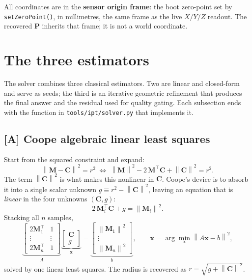 \documentclass[11pt,a4paper]{article}
\newcommand{\M}{\mathbf{M}}
\newcommand{\bP}{\mathbf{P}}
\newcommand{\bC}{\mathbf{C}}
\newcommand{\bx}{\mathbf{x}}
\newcommand{\norm}[1]{\left\lVert #1 \right\rVert}
\begin{document}
All coordinates are in the \textbf{sensor origin frame}: the boot zero-point set by
\texttt{setZeroPoint()}, in millimetres, the same frame as the live $X/Y/Z$ readout.
The recovered $\bP$ inherits that frame; it is not a world coordinate.

\section{The three estimators}
\label{sec:estimators}

The solver combines three classical estimators. Two are linear and closed-form and
serve as seeds; the third is an iterative geometric refinement that produces the
final answer and the residual used for quality gating. Each subsection ends with the
function in \texttt{tools/ipt/solver.py} that implements it.

\subsection{[A] Coope algebraic linear least squares}
\label{sec:coope}

Start from the squared constraint and expand:
\begin{equation}
  \norm{\M - \bC}^2 = r^2
  \;\Longleftrightarrow\;
  \norm{\M}^2 - 2\,\M^\top\bC + \norm{\bC}^2 = r^2 .
\end{equation}
The term $\norm{\bC}^2$ is what makes this nonlinear in $\bC$. Coope's device is to
absorb it into a single scalar unknown $g \equiv r^2 - \norm{\bC}^2$, leaving an
equation that is \emph{linear} in the four unknowns $(\bC, g)$:
\begin{equation}
  2\,\M_i^\top \bC + g = \norm{\M_i}^2 .
  \label{eq:coope-lin}
\end{equation}
Stacking all $n$ samples,
\begin{equation}
  \underbrace{\begin{bmatrix} 2\M_1^\top & 1 \\ \vdots & \vdots \\ 2\M_n^\top & 1\end{bmatrix}}_{A}
  \underbrace{\begin{bmatrix}\bC \\ g\end{bmatrix}}_{\bx}
  =
  \underbrace{\begin{bmatrix}\norm{\M_1}^2 \\ \vdots \\ \norm{\M_n}^2\end{bmatrix}}_{b},
  \qquad
  \bx = \arg\min_\bx \norm{A\bx - b}^2 ,
  \label{eq:coope-ls}
\end{equation}
solved by one linear least squares. The radius is recovered as
$r = \sqrt{g + \norm{\bC}^2}$.
\end{document}
